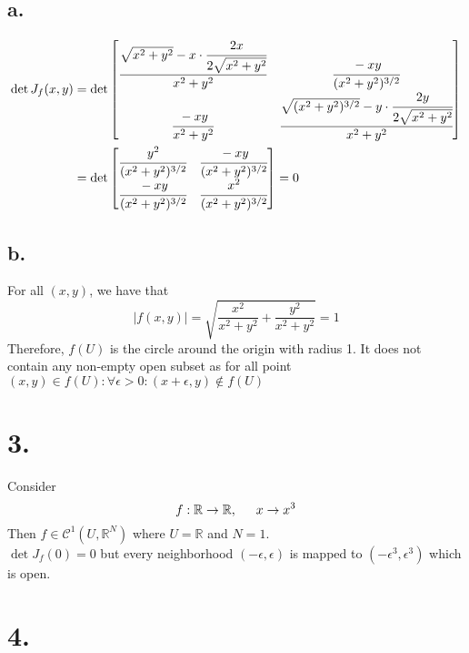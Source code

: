 \documentclass[11pt]{article}
\begin{document}
\subsection*{a.}
\begin{equation*}
    \begin{aligned}
        \det J_f(x,y) &= 
        \det 
        \begin{bmatrix}
            \cfrac{\sqrt{x^2+y^2} - x \cdot \cfrac{2x}{2\sqrt{x^2+y^2}}}{x^2+y^2} & \cfrac{-xy}{(x^2+y^2)^{3/2}}\\
            \cfrac{-xy}{x^2+y^2} & \cfrac{\sqrt{(x^2+y^2)^{3/2}} - y \cdot \cfrac{2y}{2\sqrt{x^2+y^2}}}{x^2+y^2}
        \end{bmatrix}  \\
        &=  
        \det 
        \begin{bmatrix}
            \cfrac{y^2}{(x^2+y^2)^{3/2}} & \cfrac{-xy}{(x^2+y^2)^{3/2}} \\
            \cfrac{-xy}{(x^2+y^2)^{3/2}} & \cfrac{x^2}{(x^2+y^2)^{3/2}}
        \end{bmatrix} 
        =0 \\
    \end{aligned}
\end{equation*}
\subsection*{b.}
For all $(x,y)$, we have that 
\[
    |f(x,y)| = \sqrt{\frac{x^2}{x^2 + y^2} + \frac{y^2}{x^2 + y^2}} = 1    
\]
Therefore, $f(U)$ is the circle around the origin with radius 1. It does not contain any non-empty open 
subset as for all point $(x,y) \in f(U): \forall \epsilon >0: (x+\epsilon, y) \notin f(U)$
\pagebreak
\section*{3.}
Consider 
\[
    f: \mathbb{R} \to \mathbb{R}, \indent x \to x^3
\]
Then $f \in \mathcal{C}^1(U,\mathbb{R}^N)$ where $U = \mathbb{R}$ and $N=1$. \\
$\det J_f(0) = 0$ but every neighborhood $(-\epsilon , \epsilon)$ is mapped to $(-\epsilon^3, \epsilon^3)$ which is open. 
\pagebreak
\section*{4.}
\end{document}
